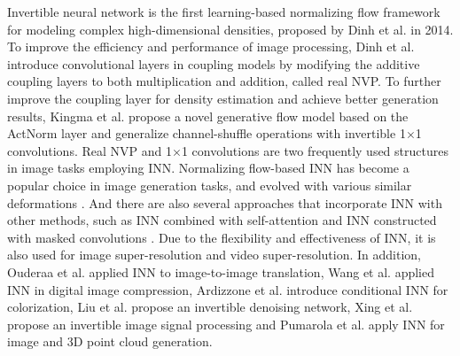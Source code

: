 \documentclass[sigconf]{acmart}
\begin{document}
Invertible neural network is the first learning-based normalizing flow framework for modeling complex high-dimensional densities, proposed by Dinh et al. \cite{dinh2014nice} in 2014. To improve the efficiency and performance of image processing, Dinh et al. \cite{dinh2016density} introduce convolutional layers in coupling models by modifying the additive coupling layers to both multiplication and addition, called real NVP. To further improve the coupling layer for density estimation and achieve better generation results, Kingma et al. \cite{kingma2018glow} propose a novel generative flow model based on the ActNorm layer and generalize channel-shuffle operations with invertible 1$\times$1 convolutions. Real NVP and 1$\times$1 convolutions are two frequently used structures in image tasks employing INN. Normalizing flow-based INN has become a popular choice in image generation tasks, and evolved with various similar deformations \cite{grathwohl2018ffjord,kingma2018glow,jacobsen2018revnet,behrmann2019invertible,chen2019residual}. And there are also several 
approaches that incorporate INN with other methods, such as INN combined with self-attention \cite{ho2019flow++} and INN constructed with masked convolutions \cite{song2019mintnet}. Due to the flexibility and effectiveness of INN, it is also used for image super-resolution \cite{xiao2020invertible,lugmayr2020srflow} and video super-resolution\cite{zhu2019residual}. In addition, Ouderaa et al.\cite{van2019reversible} applied INN to image-to-image translation, Wang et al.\cite{wang2020modeling} applied INN in digital image compression, Ardizzone et al. \cite{ardizzone2019guided} introduce conditional INN for colorization, Liu et al. \cite{liu2021invertible} propose an invertible denoising network, Xing et al. \cite{xing2021invertible} propose an invertible image signal processing and Pumarola et al. \cite{pumarola2020c} apply INN for image and 3D point cloud generation.
\end{document}
